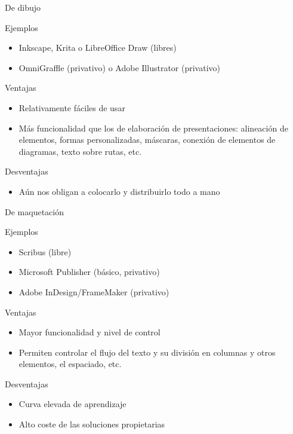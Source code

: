 \documentclass[xcolor=svgnames,compress]{beamer}
\begin{document}
\begin{frame}{De dibujo}

  \begin{block}{Ejemplos}
    \begin{itemize}
    \item Inkscape, Krita o LibreOffice Draw (libres)
    \item OmniGraffle (privativo) o Adobe Illustrator (privativo)
    \end{itemize}
  \end{block}

  \begin{block}{Ventajas}
    \begin{itemize}
    \item Relativamente fáciles de usar
    \item Más funcionalidad que los de elaboración de presentaciones:
      alineación de elementos, formas personalizadas, máscaras,
      conexión de elementos de diagramas, texto sobre rutas, etc.
    \end{itemize}
  \end{block}

  \begin{block}{Desventajas}
    \begin{itemize}
    \item Aún nos obligan a colocarlo y distribuirlo todo a mano
    \end{itemize}
  \end{block}
  
\end{frame}

\begin{frame}{De maquetación}

  \begin{block}{Ejemplos}
    \begin{itemize}
    \item Scribus (libre)
    \item Microsoft Publisher (básico, privativo)
    \item Adobe InDesign/FrameMaker (privativo)
    \end{itemize}
  \end{block}

  \begin{block}{Ventajas}
    \begin{itemize}
    \item Mayor funcionalidad y nivel de control
    \item Permiten controlar el flujo del texto y su división en
      columnas y otros elementos, el espaciado, etc.
    \end{itemize}
  \end{block}

  \begin{block}{Desventajas}
    \begin{itemize}
    \item Curva elevada de aprendizaje
    \item Alto coste de las soluciones propietarias
    \end{itemize}
  \end{block}

\end{frame}
\end{document}
